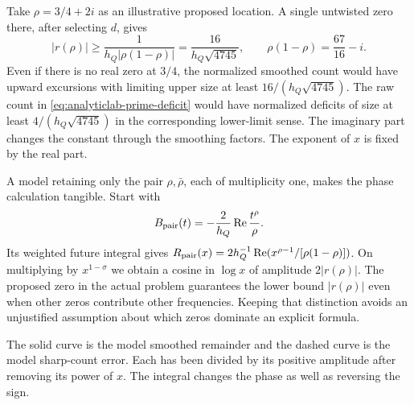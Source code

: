 \documentclass[11pt,letterpaper]{article}
\renewcommand{\Re}{\operatorname{Re}}
\begin{document}
Take \(\rho=3/4+2i\) as an illustrative proposed location. A single untwisted zero there, after selecting \(d\), gives
\[
 |r(\rho)|\ge\frac{1}{h_Q|\rho(1-\rho)|}
     =\frac{16}{h_Q\sqrt{4745}},\qquad
 \rho(1-\rho)=\frac{67}{16}-i .
\]
Even if there is no real zero at \(3/4\), the normalized smoothed count would have upward excursions with limiting upper size at least \(16/(h_Q\sqrt{4745})\). The raw count in \eqref{eq:analyticlab-prime-deficit} would have normalized deficits of size at least \(4/(h_Q\sqrt{4745})\) in the corresponding lower-limit sense. The imaginary part changes the constant through the smoothing factors. The exponent of \(x\) is fixed by the real part.

A model retaining only the pair \(\rho,\bar\rho\), each of multiplicity one, makes the phase calculation tangible. Start with
\[
 B_{\rm pair}(t)=-\frac{2}{h_Q}\Re\frac{t^\rho}{\rho}.
\]
Its weighted future integral gives \(R_{\rm pair}(x)=2h_Q^{-1}\Re(x^{\rho-1}/[\rho(1-\rho)])\). On multiplying by \(x^{1-\sigma}\) we obtain a cosine in \(\log x\) of amplitude \(2|r(\rho)|\). The proposed zero in the actual problem guarantees the lower bound \(|r(\rho)|\) even when other zeros contribute other frequencies. Keeping that distinction avoids an unjustified assumption about which zeros dominate an explicit formula.

\begin{center}

\small\color{quiet}The solid curve is the model smoothed remainder and the dashed curve is the model sharp-count error. Each has been divided by its positive amplitude after removing its power of \(x\). The integral changes the phase as well as reversing the sign.
\end{center}
\end{document}
